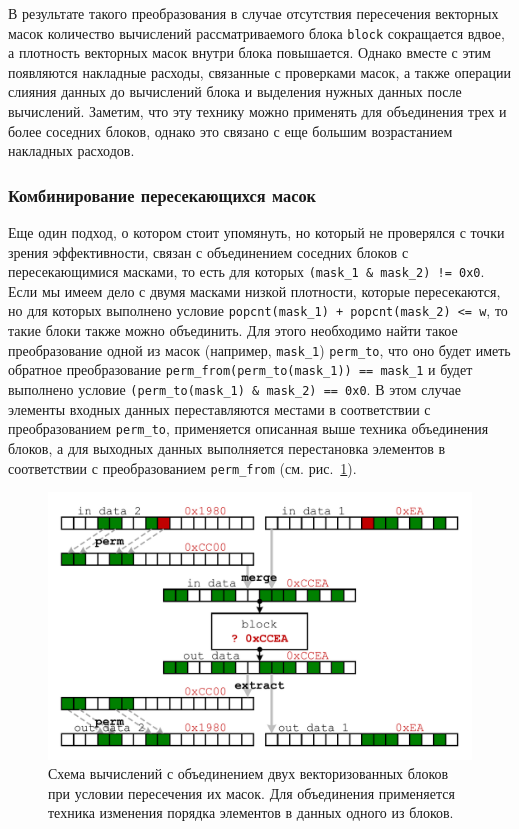 В результате такого преобразования в случае отсутствия пересечения векторных масок количество вычислений рассматриваемого блока \texttt{block} сокращается вдвое, а плотность векторных масок внутри блока повышается.
Однако вместе с этим появляются накладные расходы, связанные с проверками масок, а также операции слияния данных до вычислений блока и выделения нужных данных после вычислений.
Заметим, что эту технику можно применять для объединения трех и более соседних блоков, однако это связано с еще большим возрастанием накладных расходов.

\subsubsection{Комбинирование пересекающихся масок}

Еще один подход, о котором стоит упомянуть, но который не проверялся с точки зрения эффективности, связан с объединением соседних блоков с пересекающимися масками, то есть для которых \texttt{(mask\_1 \& mask\_2) != 0x0}.
Если мы имеем дело с двумя масками низкой плотности, которые пересекаются, но для которых выполнено условие \texttt{popcnt(mask\_1) + popcnt(mask\_2) <= w}, то такие блоки также можно объединить.
Для этого необходимо найти такое преобразование одной из масок (например, \texttt{mask\_1}) \texttt{perm\_to}, что оно будет иметь обратное преобразование \texttt{perm\_from(perm\_to(mask\_1)) == mask\_1} и будет выполнено условие \texttt{(perm\_to(mask\_1) \& mask\_2) == 0x0}.
В этом случае элементы входных данных переставляются местами в соответствии с преобразованием \texttt{perm\_to}, применяется описанная выше техника объединения блоков, а для выходных данных выполняется перестановка элементов в соответствии с преобразованием \texttt{perm\_from} (см. рис.~\ref{fig:text_4_vec_comb_mask_comb_masks_perm}).

\begin{figure}[ht]
\centering
\includegraphics[width=1.0\textwidth]{./pics/text_4_vec_comb_mask/comb_masks_perm.pdf}
\singlespacing
{}\caption{Схема вычислений с объединением двух векторизованных блоков при условии пересечения их масок. Для объединения применяется техника изменения порядка элементов в данных одного из блоков.}
\label{fig:text_4_vec_comb_mask_comb_masks_perm}
\end{figure}

